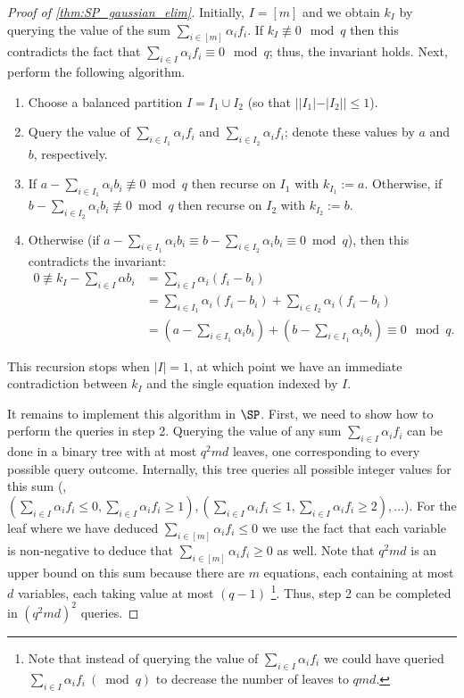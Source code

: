 \begin{proof}[Proof of \autoref{thm:SP_gaussian_elim}]
	Initially, $I = [m]$ and we obtain $k_I$ by querying the value of the sum $\sum_{i \in [m]} \alpha_i f_i$. If $k_I \not \equiv 0 \mod q$ then this contradicts the fact that $\sum_{i \in I} \alpha_i f_i \equiv 0 \mod q$; thus, the invariant holds.  Next, perform the following algorithm.
	\begin{enumerate}
		\item Choose a balanced partition $I = I_1 \cup I_2$ (so that $||I_1|-|I_2|| \leq 1$).
		\item Query the value of $\sum_{i \in I_1} \alpha_i f_i$ and $ \sum_{i \in I_2} \alpha_i f_i$; denote these values by $a$ and $b$, respectively.
		\item If $a -\sum_{i \in I_1} \alpha_i b_i \not \equiv 0 \bmod q$ then recurse on $I_1$ with $k_{I_1} := a$. Otherwise, if $b -\sum_{i \in I_2} \alpha_i b_i \not \equiv 0 \bmod q$ then recurse on $I_2$ with $k_{I_2} := b$.
		\item Otherwise (if $a -\sum_{i \in I_1} \alpha_i b_i \equiv b -\sum_{i \in I_2} \alpha_i b_i \equiv 0 \bmod q$), then this contradicts the invariant:
			\begin{align*} 0  \not \equiv k_I - \sum_{i \in I} \alpha b_i
			&= \sum_{i \in I} \alpha_i (f_i-b_i) \\ &= \sum_{i \in I_1} \alpha_i (f_i-b_i) + \sum_{i \in I_2} \alpha_i (f_i-b_i) \\ 
			&= (a-\sum_{i\in I_1} \alpha_ib_i) + (b-\sum_{i\in I_1} \alpha_ib_i) \equiv 0 \mod q.	
			\end{align*}
	\end{enumerate}
	This recursion stops when $|I| = 1$, at which point we have an immediate contradiction between $k_I$ and the single equation indexed by $I$. 
	
	It remains to implement this algorithm in $\SP$. First, we need to show how to perform the queries in step 2. 
	Querying the value of any sum $\sum_{i \in I} \alpha_i f_i$ can be done in a binary tree with at most $q^2md$ leaves, one corresponding to every possible query outcome. Internally, this tree queries all possible integer values for this sum (\eg,  $(\sum_{i \in I} \alpha_i f_i \leq 0, \sum_{i \in I} \alpha_i f_i \geq 1), (\sum_{i \in I} \alpha_i f_i \leq 1, \sum_{i \in I} \alpha_i f_i \geq 2), \ldots$). For the leaf where we have deduced $\sum_{i \in [m]} \alpha_i f_i \leq 0$ we use the fact that each variable is non-negative to deduce that $\sum_{i \in [m]} \alpha_i f_i \geq 0$ as well. 
	Note that $q^2md$ is an upper bound on this sum because there are $m$ equations, each containing at most $d$ variables, each taking value at most $(q-1)$ \footnote{Note that instead of querying the value of $\sum_{i \in I} \alpha_i f_i$ we could have queried $\sum_{i \in I} \alpha_i f_i ~(\bmod q)$ to decrease the number of leaves to $qmd$.}. Thus, step 2 can be completed in $(q^2md)^2$ queries.
	

\end{proof}
